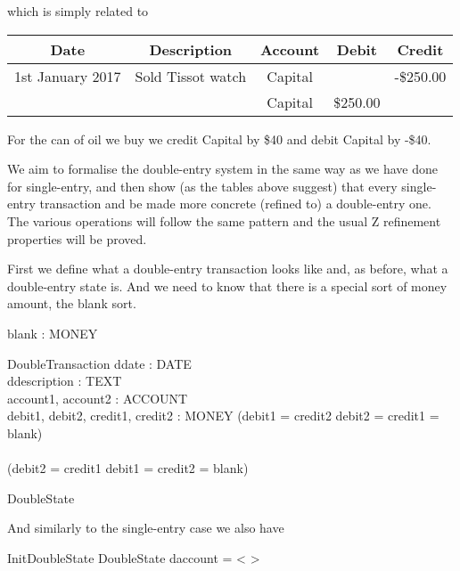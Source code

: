 \documentclass[11pt]{amsart}
\begin{document}
which is simply related to

\begin{table}[h]
\begin{center}
\begin{tabular}{|c|c|c|c|c|}
Date & Description & Account & Debit & Credit\\
\hline \hline
1st January 2017 & Sold Tissot watch & Capital &   &-\$250.00 \\
\hline
& &  Capital & \$250.00 &  \\
\end{tabular}
\end{center}
\label{default}
\end{table}%

For the can of oil we buy we credit Capital by \$40 and debit Capital by -\$40.

\newpage

We aim to formalise the double-entry system in the same way as we have done for single-entry, and then show (as the tables above suggest) that every single-entry transaction and be made more concrete (refined to) a double-entry one. The various operations will follow the same pattern and the usual Z refinement properties will be proved. 

First we define what a double-entry transaction looks like and, as before, what a double-entry state is. And we need to know that there is a special sort of money amount, the blank sort.

\begin{axdef}
blank : MONEY
\end{axdef}

\begin{schema}{DoubleTransaction}
ddate : DATE\\
ddescription : TEXT\\
account1, account2 : ACCOUNT\\
debit1, debit2, credit1, credit2 : MONEY
\where
(debit1 = credit2 \land debit2 = credit1 = blank)\\
\lor\\
(debit2 = credit1 \land debit1 = credit2 = blank)
\end{schema}

\begin{zed}
DoubleState 
\end{zed}

And similarly to the single-entry case we also have

\begin{schema}{InitDoubleState}
DoubleState
\where
daccount = < >
\end{schema}
\end{document}
